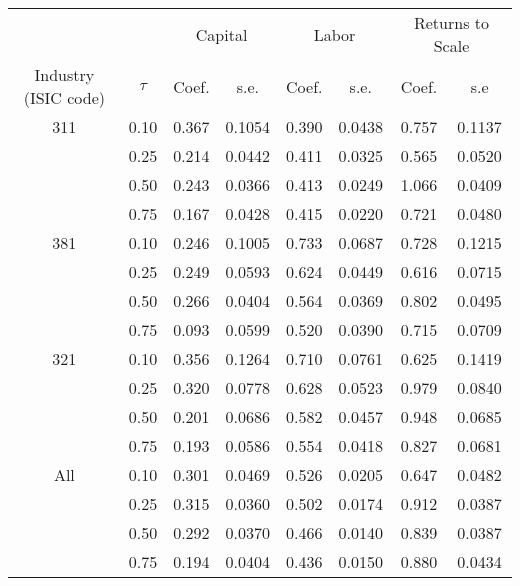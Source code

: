 \begin{table}[ht]
\centering
\begin{tabular}{cccccccc}
  \hline\hline & & \multicolumn{2}{c}{Capital}  & \multicolumn{2}{c}{Labor} & \multicolumn{2}{c}{Returns to Scale} \\ \cmidrule(lr){3-4} \cmidrule(lr){5-6} \cmidrule(lr){7-8}Industry (ISIC code) & $\tau$ & Coef. & s.e. & Coef. & s.e. & Coef. & s.e \\ 
  \hline
311 & 0.10 & 0.367 & 0.1054 & 0.390 & 0.0438 & 0.757 & 0.1137 \\ 
   & 0.25 & 0.214 & 0.0442 & 0.411 & 0.0325 & 0.565 & 0.0520 \\ 
   & 0.50 & 0.243 & 0.0366 & 0.413 & 0.0249 & 1.066 & 0.0409 \\ 
   & 0.75 & 0.167 & 0.0428 & 0.415 & 0.0220 & 0.721 & 0.0480 \\ 
  381 & 0.10 & 0.246 & 0.1005 & 0.733 & 0.0687 & 0.728 & 0.1215 \\ 
   & 0.25 & 0.249 & 0.0593 & 0.624 & 0.0449 & 0.616 & 0.0715 \\ 
   & 0.50 & 0.266 & 0.0404 & 0.564 & 0.0369 & 0.802 & 0.0495 \\ 
   & 0.75 & 0.093 & 0.0599 & 0.520 & 0.0390 & 0.715 & 0.0709 \\ 
  321 & 0.10 & 0.356 & 0.1264 & 0.710 & 0.0761 & 0.625 & 0.1419 \\ 
   & 0.25 & 0.320 & 0.0778 & 0.628 & 0.0523 & 0.979 & 0.0840 \\ 
   & 0.50 & 0.201 & 0.0686 & 0.582 & 0.0457 & 0.948 & 0.0685 \\ 
   & 0.75 & 0.193 & 0.0586 & 0.554 & 0.0418 & 0.827 & 0.0681 \\ 
  All & 0.10 & 0.301 & 0.0469 & 0.526 & 0.0205 & 0.647 & 0.0482 \\ 
   & 0.25 & 0.315 & 0.0360 & 0.502 & 0.0174 & 0.912 & 0.0387 \\ 
   & 0.50 & 0.292 & 0.0370 & 0.466 & 0.0140 & 0.839 & 0.0387 \\ 
   & 0.75 & 0.194 & 0.0404 & 0.436 & 0.0150 & 0.880 & 0.0434 \\ 
   \hline
\end{tabular}
\end{table}

